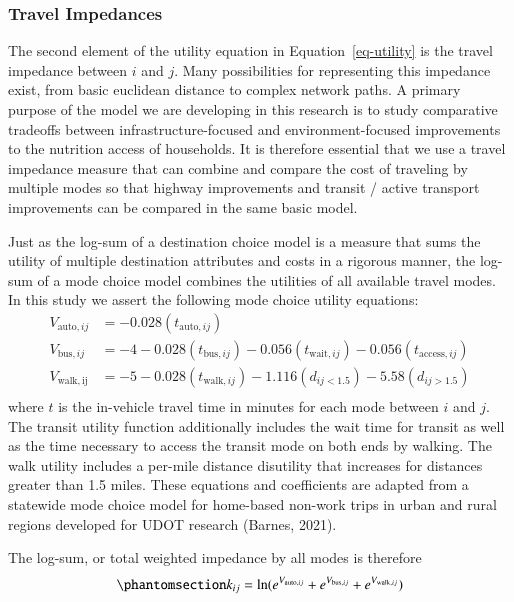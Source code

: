 \documentclass[
  letterpaper,
  number,
  review,
  doubleblind,
  3p]{elsarticle}
\begin{document}
\subsubsection{Travel Impedances}\label{sec-mcls}

The second element of the utility equation in Equation~\ref{eq-utility}
is the travel impedance between \(i\) and \(j\). Many possibilities for
representing this impedance exist, from basic euclidean distance to
complex network paths. A primary purpose of the model we are developing
in this research is to study comparative tradeoffs between
infrastructure-focused and environment-focused improvements to the
nutrition access of households. It is therefore essential that we use a
travel impedance measure that can combine and compare the cost of
traveling by multiple modes so that highway improvements and transit /
active transport improvements can be compared in the same basic model.

Just as the log-sum of a destination choice model is a measure that sums
the utility of multiple destination attributes and costs in a rigorous
manner, the log-sum of a mode choice model combines the utilities of all
available travel modes. In this study we assert the following mode
choice utility equations: \begin{align*} 
  V_{\mathrm{auto}, ij} &= -0.028(t_{\mathrm{auto}, ij})\\
  V_{\mathrm{bus}, ij} &= -4 -0.028(t_{\mathrm{bus}, ij}) -0.056(t_{\mathrm{wait}, ij}) -0.056(t_{\mathrm{access}, ij})\\
  V_{\mathrm{walk, ij}} &= -5 -0.028(t_{\mathrm{walk}, ij}) -1.116(d_{ij<1.5}) -5.58(d_{ij>1.5})\\
\end{align*} where \(t\) is the in-vehicle travel time in minutes for
each mode between \(i\) and \(j\). The transit utility function
additionally includes the wait time for transit as well as the time
necessary to access the transit mode on both ends by walking. The walk
utility includes a per-mile distance disutility that increases for
distances greater than 1.5 miles. These equations and coefficients are
adapted from a statewide mode choice model for home-based non-work trips
in urban and rural regions developed for UDOT research (Barnes, 2021).

The log-sum, or total weighted impedance by all modes is therefore
\begin{equation}\phantomsection\label{eq-mcls}{
k_{ij} = \ln(e^{V_{\mathrm{auto}, ij}} + e^{V_{\mathrm{bus}, ij}} + e^{V_{\mathrm{walk},ij}})
}\end{equation}
\end{document}
